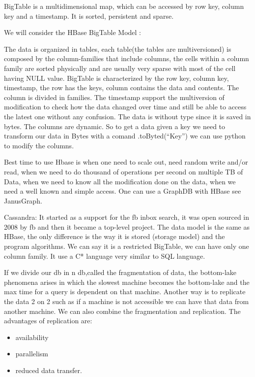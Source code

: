 \documentclass[a4page, 11pt]{article}
\begin{document}
BigTable is a multidimensional map, which can be accessed by row key, column key and a timestamp. It is sorted, persistent and sparse.

We will consider the HBase BigTable Model :

The data is organized in tables, each table(the tables are multiversioned) is composed by the column-families that include columns, the cells within a column family are sorted physically and are usually very sparse with most of the cell having NULL value. 
BigTable is characterized by the row key, column key, timestamp, the row has the keys, column contains the data and contents. 
The column is divided in families. The timestamp support the multiversion of modification to check how the data changed over time and still be able to access the latest one without any confusion. 
The data is without type since it is saved in bytes. The columns are dynamic. So to get a data given a key we need to transform our data in Bytes with a comand .toByted(``Key'') we can use python to modify the columns.

Best time to use Hbase is when one need to scale out, need random write and/or read, when we need to do thousand of operations per second on multiple TB of Data, when we need to know all the modification done on
the data, when we need a well known and simple access. One can use a GraphDB with HBase see JanusGraph.

Cassandra: It started as a support for the fb inbox search, it was open sourced in 2008 by fb and then it became a top-level project. The data model is the same as HBase, the only difference is the way it is stored (storage model) and the program algorithms. We can say it is a restricted BigTable, we can have only one column family. It use a C* language very similar to SQL language.

If we divide our db in n db,called the fragmentation of data, the bottom-lake phenomena arises in which the slowest machine becomes the bottom-lake and the max time for a query is dependent on that machine. 
Another way is to replicate the data 2 on 2 such as if a machine is not accessible we can have that data from another machine. We can also combine the fragmentation and replication.
The advantages of replication are:
\begin{itemize}[noitemsep]
	\item
	availability
	\item
	parallelism
	\item
	reduced data transfer.
\end{itemize}
\end{document}
